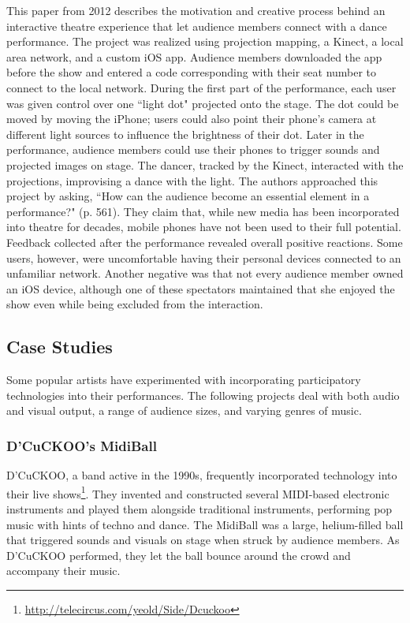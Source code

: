 This paper from 2012 describes the motivation and creative process behind an interactive theatre experience that let audience members connect with a dance performance. The project was realized using projection mapping, a Kinect, a local area network, and a custom iOS app. Audience members downloaded the app before the show and entered a code corresponding with their seat number to connect to the local network. During the first part of the performance, each user was given control over one ``light dot" projected onto the stage. The dot could be moved by moving the iPhone; users could also point their phone's camera at different light sources to influence the brightness of their dot. Later in the performance, audience members could use their phones to trigger sounds and projected images on stage. The dancer, tracked by the Kinect, interacted with the projections, improvising a dance with the light. The authors approached this project by asking, ``How can the audience become an essential element in a performance?" (p. 561). They claim that, while new media has been incorporated into theatre for decades, mobile phones have not been used to their full potential. Feedback collected after the performance revealed overall positive reactions. Some users, however, were uncomfortable having their personal devices connected to an unfamiliar network. Another negative was that not every audience member owned an iOS device, although one of these spectators maintained that she enjoyed the show even while being excluded from the interaction.

\subsection{Case Studies}

Some popular artists have experimented with incorporating participatory technologies into their performances. The following projects deal with both audio and visual output, a range of audience sizes, and varying genres of music.

\subsubsection{D'CuCKOO's MidiBall}

D'CuCKOO, a band active in the 1990s, frequently incorporated technology into their live shows\footnote{\url{http://telecircus.com/yeold/Side/Dcuckoo}}. They invented and constructed several MIDI-based electronic instruments and played them alongside traditional instruments, performing pop music with hints of techno and dance. The MidiBall was a large, helium-filled ball that triggered sounds and visuals on stage when struck by audience members. As D'CuCKOO performed, they let the ball bounce around the crowd and accompany their music.

